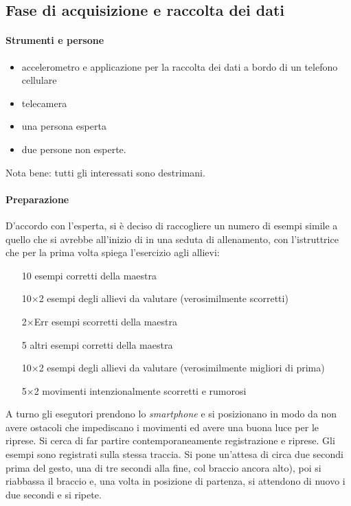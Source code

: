 \subsection{Fase di acquisizione e raccolta dei dati}

\paragraph{Strumenti e persone} 

\begin{itemize}
  \item accelerometro e applicazione per la raccolta dei dati a bordo di un telefono cellulare
  \item telecamera
  \item una persona esperta
  \item due persone non esperte.
\end{itemize}
Nota bene: tutti gli interessati sono destrimani.

\paragraph{Preparazione}
D'accordo con l'esperta, si è deciso di raccogliere un numero di esempi simile a quello che si avrebbe all'inizio di in una seduta di allenamento, con l'istruttrice che per la prima volta spiega l'esercizio agli allievi:
\begin{itemize}
	\item[10] esempi corretti della maestra
    \item[10$\times$2] esempi degli allievi da valutare (verosimilmente scorretti) 
    \item[2$\times$Err] esempi scorretti della maestra
    \item[5] altri esempi corretti della maestra
    \item[10$\times$2] esempi degli allievi da valutare (verosimilmente migliori di prima)
    \item[5$\times$2] movimenti intenzionalmente scorretti e rumorosi
\end{itemize}
A turno gli esegutori prendono lo \textit{smartphone} e
si posizionano in modo da non avere ostacoli che impediscano i movimenti
ed avere una buona luce per le riprese.
Si cerca di far partire contemporaneamente registrazione e riprese.
Gli esempi sono registrati sulla stessa traccia.
Si pone un'attesa di circa due secondi prima del gesto,
una di tre secondi alla fine, col braccio ancora alto),
poi si riabbassa il braccio e,
una volta in posizione di partenza,
si attendono di nuovo i due secondi e si ripete.



